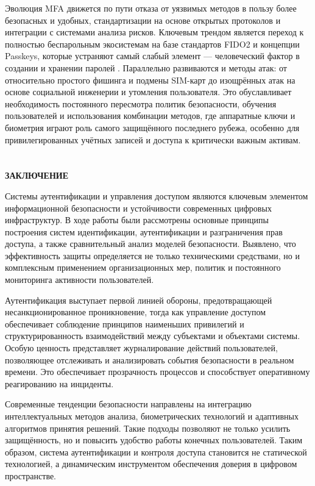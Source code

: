 \documentclass{SibFU-docs}
\begin{document}

Эволюция MFA движется по пути отказа от уязвимых методов в пользу более безопасных и удобных, стандартизации на основе открытых протоколов и интеграции с системами анализа рисков. Ключевым трендом является переход к полностью беспарольным экосистемам на базе стандартов FIDO2 и концепции Passkeys, которые устраняют самый слабый элемент — человеческий фактор в создании и хранении паролей \cite{anti_malware_mfa_2025}. Параллельно развиваются и методы атак: от относительно простого фишинга и подмены SIM-карт до изощрённых атак на основе социальной инженерии и утомления пользователя. Это обуславливает необходимость постоянного пересмотра политик безопасности, обучения пользователей и использования комбинации методов, где аппаратные ключи и биометрия играют роль самого защищённого последнего рубежа, особенно для привилегированных учётных записей и доступа к критически важным активам.

\newpage
\section*{}
\vspace*{-2.5em}
\begin{center}\textbf{ЗАКЛЮЧЕНИЕ}\end{center}
{}

Системы аутентификации и управления доступом являются ключевым элементом информационной безопасности и устойчивости современных цифровых инфраструктур. В ходе работы были рассмотрены основные принципы построения систем идентификации, аутентификации и разграничения прав доступа, а также сравнительный анализ моделей безопасности. Выявлено, что эффективность защиты определяется не только техническими средствами, но и комплексным применением организационных мер, политик и постоянного мониторинга активности пользователей.

Аутентификация выступает первой линией обороны, предотвращающей несанкционированное проникновение, тогда как управление доступом обеспечивает соблюдение принципов наименьших привилегий и структурированность взаимодействий между субъектами и объектами системы. Особую ценность представляет журналирование действий пользователей, позволяющее отслеживать и анализировать события безопасности в реальном времени. Это обеспечивает прозрачность процессов и способствует оперативному реагированию на инциденты.

Современные тенденции безопасности направлены на интеграцию интеллектуальных методов анализа, биометрических технологий и адаптивных алгоритмов принятия решений. Такие подходы позволяют не только усилить защищённость, но и повысить удобство работы конечных пользователей. Таким образом, система аутентификации и контроля доступа становится не статической технологией, а динамическим инструментом обеспечения доверия в цифровом пространстве.
\end{document}
